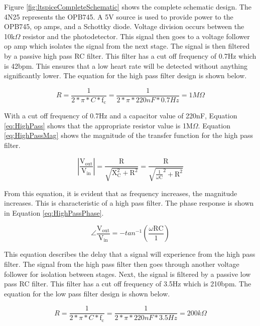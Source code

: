 \documentclass[CMPE]{KGCOEReport}
\begin{document}
Figure \ref{fig:ltspiceCompleteSchematic} shows the complete schematic design. The 4N25 represents the OPB745. A 5V source is used to provide power to the OPB745, op amps, and a Schottky diode. Voltage division occurs between the 10k$\Omega$ resistor and the photodetector. This signal then goes to a voltage follower op amp which isolates the signal from the next stage. The signal is then filtered by a passive high pass RC filter. This filter has a cut off frequency of 0.7Hz which is 42bpm. This ensures that a low heart rate will be detected without anything significantly lower. The equation for the high pass filter design is shown below.

\begin{equation}
R = \frac{1}{2*\pi*C*\text{f}_\text{c}} = \frac{1}{2*\pi*220nF*0.7Hz} = 1M\Omega \label{eq:HighPass}
\end{equation}

With a cut off frequency of 0.7Hz and a capacitor value of 220nF, Equation \ref{eq:HighPass} shows that the appropriate resistor value is 1M$\Omega$. Equation \ref{eq:HighPassMag} shows the magnitude of the transfer function for the high pass filter.

\begin{equation}
|\frac{\text{V}_\text{out}}{\text{V}_\text{in}}| = \frac{\text{R}}{\sqrt{\text{X}_\text{C}^2 + \text{R}^2}} = \frac{\text{R}}{\sqrt{\frac{1}{\omega\text{C}}^2 + \text{R}^2}} \label{eq:HighPassMag}
\end{equation}

From this equation, it is evident that as frequency increases, the magnitude increases. This is characteristic of a high pass filter. The phase response is shown in Equation \ref{eq:HighPassPhase}.

\begin{equation}
\angle\frac{\text{V}_\text{out}}{\text{V}_\text{in}} = -tan^{-1}(\frac{\omega\text{R}\text{C}}{1}) \label{eq:HighPassPhase}
\end{equation}

This equation describes the delay that a signal will experience from the high pass filter. The signal from the high pass filter then goes through another voltage follower for isolation between stages. Next, the signal is filtered by a passive low pass RC filter. This filter has a cut off frequency of 3.5Hz which is 210bpm.  The equation for the low pass filter design is shown below.

\begin{equation}
R = \frac{1}{2*\pi*C*\text{f}_\text{c}} = \frac{1}{2*\pi*220nF*3.5Hz} = 200k\Omega \label{eq:LowPass}
\end{equation}
\end{document}
